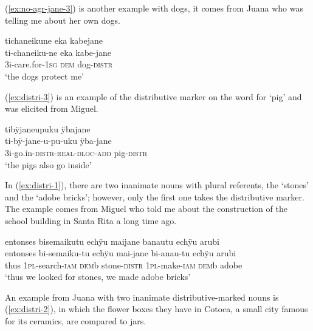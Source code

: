
 (\ref{ex:no-agr-jane-3}) is another example with dogs, it comes from Juana who was telling me about her own dogs.

\ea\label{ex:no-agr-jane-3}
\begingl 
\glpreamble tichaneikune eka kabejane\\
\gla ti-chaneiku-ne eka kabe-jane\\ 
\glb 3i-care.for-1\textsc{sg} \textsc{dem} dog-\textsc{distr}\\ 
\glft ‘the dogs protect me’
\trailingcitation{[jxx-e150925l-1.093]}
\xe

\largerpage
(\ref{ex:distri-3}) is an example of the distributive marker on the word for ‘pig’ and was elicited from Miguel.

\ea\label{ex:distri-3}
\begingl
\glpreamble tibÿjaneupuku ÿbajane\\
\gla ti-bÿ-jane-u-pu-uku ÿba-jane\\
\glb 3i-go.in-\textsc{distr}-\textsc{real}-\textsc{dloc}-\textsc{add} pig-\textsc{distr}\\
\glft ‘the pigs also go inside’
\endgl
\trailingcitation{[mrx-e150219s.102]}
\xe

In (\ref{ex:distri-1}), there are two inanimate nouns with plural referents, the ‘stones’ and the ‘adobe bricks’; however, only the first one takes the distributive marker. The example comes from Miguel who told me about the construction of the school building in Santa Rita a long time ago.

\ea\label{ex:distri-1}
\begingl
\glpreamble entonses bisemaikutu echÿu maijane banautu echÿu arubi\\
\gla entonses bi-semaiku-tu echÿu mai-jane bi-anau-tu echÿu arubi\\
\glb thus 1\textsc{pl}-search-\textsc{iam} \textsc{dem}b stone-\textsc{distr} 1\textsc{pl}-make-\textsc{iam} \textsc{dem}b adobe\\
\glft ‘thus we looked for stones, we made adobe bricks’
\endgl
\trailingcitation{[mxx-p110825l.114]}
\xe

An example from Juana with two inanimate distributive-marked nouns is (\ref{ex:distri-2}), in which the flower boxes they have in Cotoca, a small city famous for its ceramics, are compared to jars.

